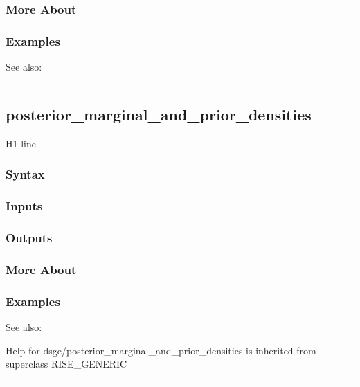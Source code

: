 \documentclass[letterpaper,10pt,english]{sphinxmanual}
\begin{document}
\subsubsection{More About}
\label{classes/models/@dsge/dsge:id108}

\subsubsection{Examples}
\label{classes/models/@dsge/dsge:id109}
See also:


\bigskip\hrule{}\bigskip



\subsection{posterior\_marginal\_and\_prior\_densities}
\label{classes/models/@dsge/dsge:id110}\label{classes/models/@dsge/dsge:posterior-marginal-and-prior-densities}
H1 line


\subsubsection{Syntax}
\label{classes/models/@dsge/dsge:id111}

\subsubsection{Inputs}
\label{classes/models/@dsge/dsge:id112}

\subsubsection{Outputs}
\label{classes/models/@dsge/dsge:id113}

\subsubsection{More About}
\label{classes/models/@dsge/dsge:id114}

\subsubsection{Examples}
\label{classes/models/@dsge/dsge:id115}
See also:

Help for dsge/posterior\_marginal\_and\_prior\_densities is inherited from superclass RISE\_GENERIC


\bigskip\hrule{}\bigskip
\end{document}
